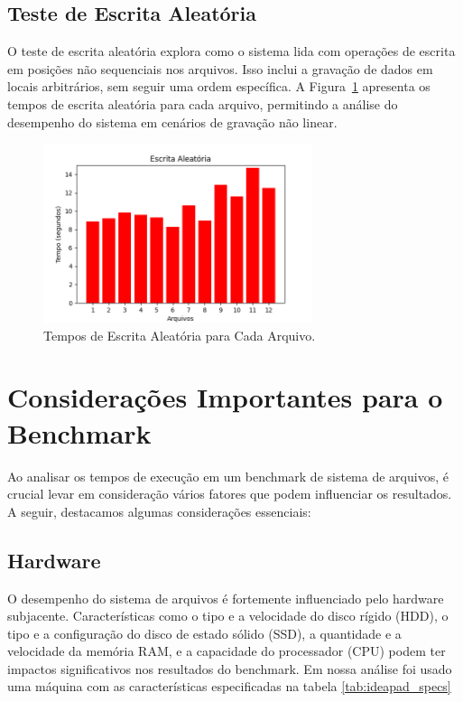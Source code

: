 \documentclass[
	12pt,				%
	openright,			%
	oneside,			%
	a4paper,			%
	chapter=TITLE,		%
	english,			%
	french,				%
	spanish,			%
	brazil				%
	]{abntex2}
\theoremstyle{definition}
\begin{document}

\subsection{Teste de Escrita Aleatória}

O teste de escrita aleatória explora como o sistema lida com operações de 
escrita em posições não sequenciais nos arquivos. Isso inclui a gravação 
de dados em locais arbitrários, sem seguir uma ordem específica. 
A Figura~\ref{fig:rw} apresenta os tempos de escrita aleatória para cada arquivo, 
permitindo a análise do desempenho do sistema em cenários de gravação não linear.

\begin{figure}[H]
    \centering
    \includegraphics[width=0.7\textwidth]{RandomWrite.png}
    \caption{Tempos de Escrita Aleatória para Cada Arquivo.}
    \label{fig:rw}
\end{figure}

\section{Considerações Importantes para o Benchmark}

Ao analisar os tempos de execução em um benchmark de sistema de arquivos, é crucial levar em 
consideração vários fatores que podem influenciar os resultados. A seguir, destacamos
algumas considerações essenciais:

\subsection{Hardware}

O desempenho do sistema de arquivos é fortemente influenciado pelo hardware 
subjacente. Características como o tipo e a velocidade do disco rígido (HDD), 
o tipo e a configuração do disco de estado sólido (SSD), a quantidade e a 
velocidade da memória RAM, e a capacidade do processador (CPU) podem ter 
impactos significativos nos resultados do benchmark. Em nossa análise foi usado
uma máquina com as características especificadas na tabela \ref{tab:ideapad_specs}
\end{document}
